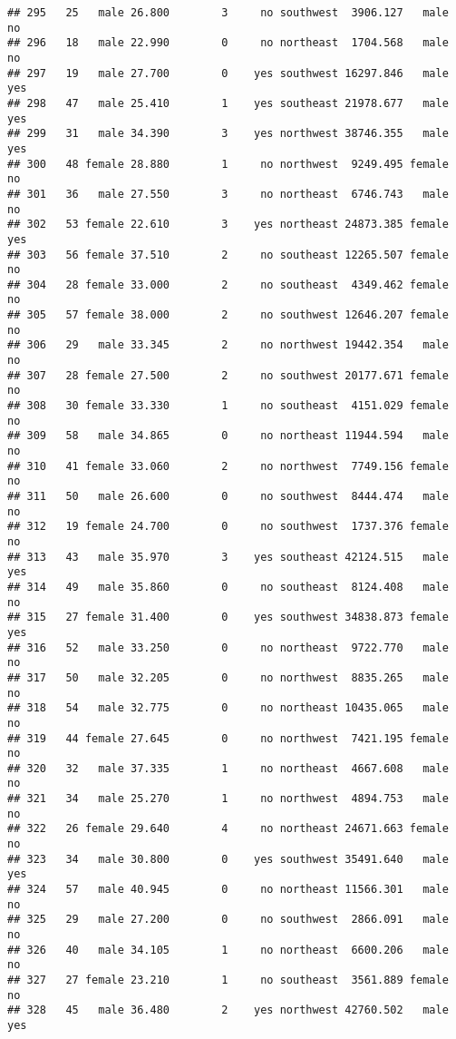 \documentclass[
]{article}
\begin{document}
\begin{verbatim}
## 295   25   male 26.800        3     no southwest  3906.127   male       no
## 296   18   male 22.990        0     no northeast  1704.568   male       no
## 297   19   male 27.700        0    yes southwest 16297.846   male      yes
## 298   47   male 25.410        1    yes southeast 21978.677   male      yes
## 299   31   male 34.390        3    yes northwest 38746.355   male      yes
## 300   48 female 28.880        1     no northwest  9249.495 female       no
## 301   36   male 27.550        3     no northeast  6746.743   male       no
## 302   53 female 22.610        3    yes northeast 24873.385 female      yes
## 303   56 female 37.510        2     no southeast 12265.507 female       no
## 304   28 female 33.000        2     no southeast  4349.462 female       no
## 305   57 female 38.000        2     no southwest 12646.207 female       no
## 306   29   male 33.345        2     no northwest 19442.354   male       no
## 307   28 female 27.500        2     no southwest 20177.671 female       no
## 308   30 female 33.330        1     no southeast  4151.029 female       no
## 309   58   male 34.865        0     no northeast 11944.594   male       no
## 310   41 female 33.060        2     no northwest  7749.156 female       no
## 311   50   male 26.600        0     no southwest  8444.474   male       no
## 312   19 female 24.700        0     no southwest  1737.376 female       no
## 313   43   male 35.970        3    yes southeast 42124.515   male      yes
## 314   49   male 35.860        0     no southeast  8124.408   male       no
## 315   27 female 31.400        0    yes southwest 34838.873 female      yes
## 316   52   male 33.250        0     no northeast  9722.770   male       no
## 317   50   male 32.205        0     no northwest  8835.265   male       no
## 318   54   male 32.775        0     no northeast 10435.065   male       no
## 319   44 female 27.645        0     no northwest  7421.195 female       no
## 320   32   male 37.335        1     no northeast  4667.608   male       no
## 321   34   male 25.270        1     no northwest  4894.753   male       no
## 322   26 female 29.640        4     no northeast 24671.663 female       no
## 323   34   male 30.800        0    yes southwest 35491.640   male      yes
## 324   57   male 40.945        0     no northeast 11566.301   male       no
## 325   29   male 27.200        0     no southwest  2866.091   male       no
## 326   40   male 34.105        1     no northeast  6600.206   male       no
## 327   27 female 23.210        1     no southeast  3561.889 female       no
## 328   45   male 36.480        2    yes northwest 42760.502   male      yes

\end{verbatim}
\end{document}
